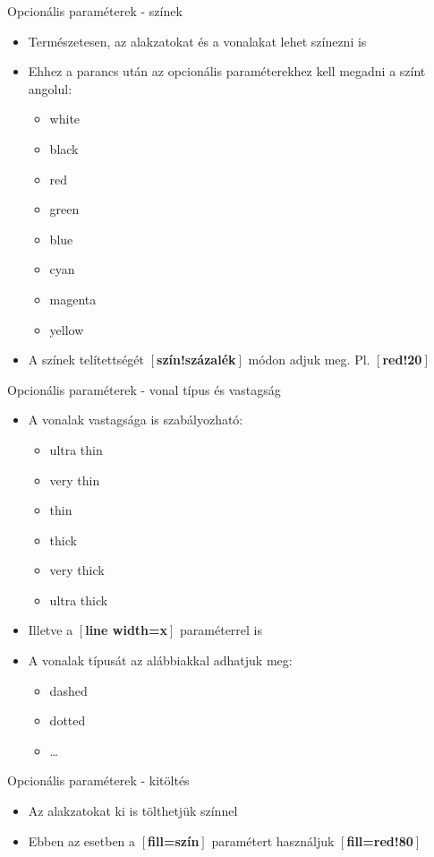 \documentclass[11pt]{beamer}
\begin{document}
\begin{frame}{Opcionális paraméterek - színek}
\begin{itemize}
\item Természetesen, az alakzatokat és a vonalakat lehet színezni is
\item Ehhez a parancs után az opcionális paraméterekhez kell megadni a színt angolul:
	\begin{itemize}
	\item white
	\item black
	\item red
	\item green
	\item blue
	\item cyan
	\item magenta
	\item yellow
	\end{itemize}
\item A színek telítettségét $\left[\right.$\textbf{szín!százalék}$\left.\right]$ módon adjuk meg. Pl. $\left[\right.$\textbf{red!20}$\left.\right]$
\end{itemize}
\end{frame}

\begin{frame}{Opcionális paraméterek - vonal típus és vastagság}
\begin{itemize}
\item A vonalak vastagsága is szabályozható:
	\begin{itemize}
	\item ultra thin
	\item very thin
	\item thin
	\item thick
	\item very thick
	\item ultra thick
	\end{itemize}
\item Illetve a $\left[\right.$\textbf{line width=x}$\left.\right]$ paraméterrel is
\item A vonalak típusát az alábbiakkal adhatjuk meg:
	\begin{itemize}
	\item dashed
	\item dotted
	\item \dots
	\end{itemize}
\end{itemize}
\end{frame}

\begin{frame}{Opcionális paraméterek - kitöltés}
\begin{itemize}
\item Az alakzatokat ki is tölthetjük színnel
\item Ebben az esetben a $\left[\right.$\textbf{fill=szín}$\left.\right]$ paramétert használjuk $\left[\right.$\textbf{fill=red!80}$\left.\right]$
\end{itemize}
\end{frame}
\end{document}

